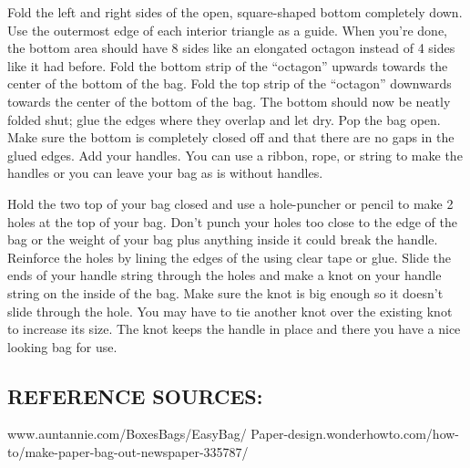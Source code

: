 \documentclass[12pt,letterpaper]{article}
\begin{document}
    Fold the left and right sides of the open, square-shaped bottom completely down. Use the outermost edge of each interior triangle as a guide. When you’re done, the bottom area should have 8 sides like an elongated octagon instead of 4 sides like it had before. Fold the bottom strip of the “octagon” upwards towards the center of the bottom of the bag. Fold the top strip of the “octagon” downwards towards the center of the bottom of the bag. The bottom should now be neatly folded shut; glue the edges where they overlap and let dry. Pop the bag open. Make sure the bottom is completely closed off and that there are no gaps in the glued edges. Add your handles. You can use a ribbon, rope, or string to make the handles or you can leave your bag as is without handles.
    
    Hold the two top of your bag closed and use a hole-puncher or pencil to make 2 holes at the top of your bag. Don't punch your holes too close to the edge of the bag or the weight of your bag plus anything inside it could break the handle. Reinforce the holes by lining the edges of the using clear tape or glue. Slide the ends of your handle string through the holes and make a knot on your handle string on the inside of the bag. Make sure the knot is big enough so it doesn't slide through the hole. You may have to tie another knot over the existing knot to increase its size. The knot keeps the handle in place and there you have a nice looking bag for use.

 \subsection{REFERENCE SOURCES:}
 www.auntannie.com/BoxesBags/EasyBag/
 Paper-design.wonderhowto.com/how-to/make-paper-bag-out-newspaper-335787/
\end{document}
